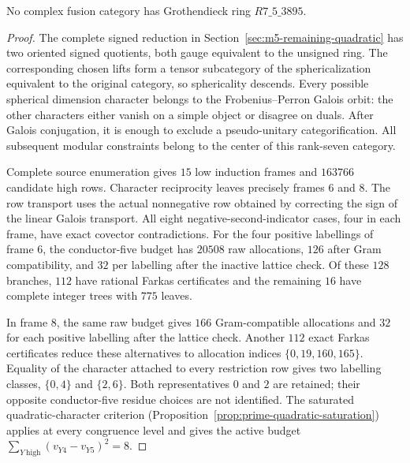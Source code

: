 \begin{proposition}
\label{prop:m5-3895-cyclic-exclusion}
No complex fusion category has Grothendieck ring $R7\_5\_3895$.
\end{proposition}
\begin{proof}
The complete signed reduction in
Section~\ref{sec:m5-remaining-quadratic} has two oriented signed
quotients, both gauge equivalent to the unsigned ring.  The corresponding
chosen lifts form a tensor subcategory of the sphericalization equivalent
to the original category, so sphericality descends.  Every possible
spherical dimension character belongs to the Frobenius--Perron Galois
orbit: the other characters either vanish on a simple object or disagree
on duals.  After Galois conjugation, it is enough to exclude a
pseudo-unitary categorification.  All subsequent modular constraints
belong to the center of this rank-seven category.

Complete source enumeration gives $15$ low induction frames and $163766$
candidate high rows.  Character reciprocity leaves precisely frames $6$
and $8$.  The row transport uses the actual nonnegative row obtained by
correcting the sign of the linear Galois transport.  All eight
negative-second-indicator cases, four in each frame, have exact
covector contradictions.  For the four positive labellings of frame $6$,
the conductor-five budget has $20508$ raw allocations, $126$ after Gram
compatibility, and $32$ per labelling after the inactive lattice check.
Of these $128$ branches, $112$ have rational Farkas certificates and the
remaining $16$ have complete integer trees with $775$ leaves.

In frame $8$, the same raw budget gives $166$ Gram-compatible allocations
and $32$ for each positive labelling after the lattice check.  Another
$112$ exact Farkas certificates reduce these alternatives to allocation
indices $\{0,19,160,165\}$.  Equality of the character attached to every
restriction row gives two labelling classes, $\{0,4\}$ and $\{2,6\}$.
Both representatives $0$ and $2$ are retained; their opposite
conductor-five residue choices are not identified.  The saturated
quadratic-character criterion
(Proposition~\ref{prop:prime-quadratic-saturation}) applies at every
congruence level and gives the active budget
$\sum_{Y\ \mathrm{high}}(v_{Y4}-v_{Y5})^2=8$.


\end{proof}
